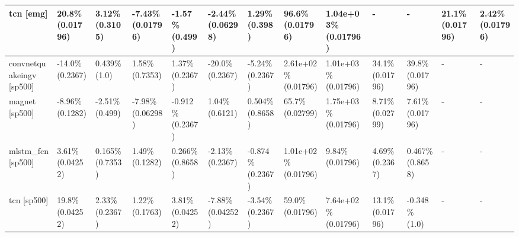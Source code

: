\begin{table}[]
\begin{adjustwidth}{-1in}{-1in}
\begin{tabular}{|l|l|l|l|l|l|l|l|l|l|l|l|l|}
tcn [emg] & \cellcolor{green} 20.8\% (0.01796) & 3.12\% (0.3105) & \cellcolor{red} -7.43\% (0.01796) & -1.57\% (0.499) & -2.44\% (0.06298) & 1.29\% (0.398) & \cellcolor{green} 96.6\% (0.01796) & \cellcolor{green} 1.04e+03\% (0.01796) & - & - & \cellcolor{green} 21.1\% (0.01796) & \cellcolor{green} 2.42\% (0.01796) \\ \hline
convnetquakeingv [sp500] & -14.0\% (0.2367) & 0.439\% (1.0) & 1.58\% (0.7353) & 1.37\% (0.2367) & -20.0\% (0.2367) & -5.24\% (0.2367) & \cellcolor{green} 2.61e+02\% (0.01796) & \cellcolor{green} 1.01e+03\% (0.01796) & \cellcolor{green} 34.1\% (0.01796) & \cellcolor{green} 39.8\% (0.01796) & - & - \\ \hline
magnet [sp500] & -8.96\% (0.1282) & -2.51\% (0.499) & -7.98\% (0.06298) & -0.912\% (0.2367) & 1.04\% (0.6121) & 0.504\% (0.8658) & \cellcolor{green} 65.7\% (0.02799) & \cellcolor{green} 1.75e+03\% (0.01796) & \cellcolor{green} 8.71\% (0.02799) & \cellcolor{green} 7.61\% (0.01796) & - & - \\ \hline
mlstm\_fcn [sp500] & \cellcolor{green} 3.61\% (0.04252) & 0.165\% (0.7353) & 1.49\% (0.1282) & 0.266\% (0.8658) & -2.13\% (0.2367) & -0.874\% (0.2367) & \cellcolor{green} 1.01e+02\% (0.01796) & \cellcolor{green} 9.84\% (0.01796) & 4.69\% (0.2367) & 0.467\% (0.8658) & - & - \\ \hline
tcn [sp500] & \cellcolor{green} 19.8\% (0.04252) & 2.33\% (0.2367) & 1.22\% (0.1763) & \cellcolor{green} 3.81\% (0.04252) & \cellcolor{red} -7.88\% (0.04252) & -3.54\% (0.2367) & \cellcolor{green} 59.0\% (0.01796) & \cellcolor{green} 7.64e+02\% (0.01796) & \cellcolor{green} 13.1\% (0.01796) & -0.348\% (1.0) & - & - \\ \hline
\end{tabular}
\end{adjustwidth}
\end{table}
